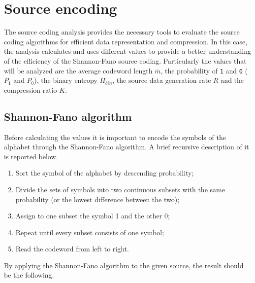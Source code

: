 \vspace{40px} \section{Source encoding}
The source coding analysis provides the necessary tools to evaluate the source coding algorithms for efficient data representation and compression. In this case, the analysis calculates and uses different values to provide a better understanding of the efficiency of the Shannon-Fano source coding. Particularly the values that will be analyzed are the average codeword length $\overline{m}$, the probability of \texttt{1} and \texttt{0} ($P_1$ and $P_0$), the binary entropy $H_{bin}$, the source data generation rate $R$ and the compression ratio $K$.


\subsection{Shannon-Fano algorithm}
Before calculating the values it is important to encode the symbols of the alphabet through the Shannon-Fano algorithm. A brief recursive description of it is reported below.
\begin{enumerate}
    \item Sort the symbol of the alphabet by descending probability;
    \item Divide the sets of symbols into two continuous subsets with the same probability (or the lowest difference between the two);
    \item Assign to one subset the symbol 1 and the other 0;
    \item Repeat until every subset consists of one symbol;
    \item Read the codeword from left to right.
\end{enumerate} 

\noindent By applying the Shannon-Fano algorithm to the given source, the result should be the following.

